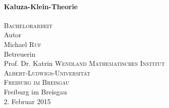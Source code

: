 \begin{titlepage}
\begin{center}
	\HRule \\[0.4cm]
	{ \huge \bfseries Kaluza-Klein-Theorie}\\
	\HRule \\[2cm]
	
	\textsc{\LARGE Bachelorarbeit}\\[1.5cm]
	
	\large Autor \\
  	\Large Michael \textsc{Ruf}\\[1.5cm]
  	
  	\large Betreuerin\\
  	\Large Prof. Dr. Katrin \textsc{Wendland}
  	\vfill
	\normalsize
	\textsc{Mathematisches Institut} \\
	\textsc{Albert-Ludwigs-Universität} \\
	\textsc{Freiburg im Breisgau} \\[2cm]
  
	\large Freiburg im Breisgau \\
	2. Februar 2015
\end{center}
\end{titlepage} 

